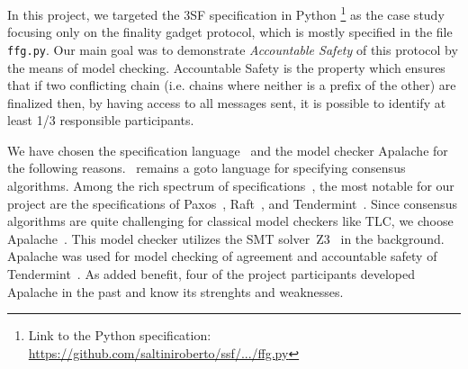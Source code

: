 In this project, we targeted the 3SF specification in Python \footnote{Link to the Python specification:
\href{https://github.com/saltiniroberto/ssf/blob/ad3ba2c21bc1cd554a870a6e0e4d87040558e129/high_level/common/ffg.py}{https://github.com/saltiniroberto/ssf/.../ffg.py}} as the case study focusing only on the finality gadget protocol, which is mostly specified in the file \texttt{ffg.py}.
Our main goal was to demonstrate 
\emph{Accountable Safety} of this protocol by the means of model checking. 
Accountable Safety is the property which ensures that if two conflicting chain (i.e. chains where neither is a prefix of the other) are finalized then, by having access to all messages sent, it is possible to identify at least 1/3 responsible participants. 



We have chosen the specification language~\tlap{} and the model checker
Apalache for the following reasons.\ \tlap{} remains a goto language for
specifying consensus algorithms. Among the rich spectrum of
specifications~\cite{tla-examples}, the most notable for our project are the
specifications of Paxos~\cite{lamport2001paxos}, Raft~\cite{Ongaro14}, and
Tendermint~\cite{abs-1807-04938,TendermintSpec2020}. Since consensus algorithms
are quite challenging for classical model checkers like TLC, we choose
Apalache~\cite{Apalache2024,KT19,KonnovKM22}. This model checker utilizes the
SMT solver~Z3~\cite{MouraB08} in the background. Apalache was used for model
checking of agreement and accountable safety of
Tendermint~\cite{TendermintSpec2020}. As added benefit, four of the project
participants developed Apalache in the past and know its strenghts and
weaknesses.


